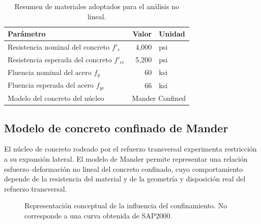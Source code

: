 \documentclass[11pt,a4paper]{article}
\begin{document}
\begin{table}[H]
\centering
\caption{Resumen de materiales adoptados para el análisis no lineal.}
\begin{tabular}{p{8.0cm}r l}
\toprule
\textbf{Parámetro} & \textbf{Valor} & \textbf{Unidad}\\
\midrule
Resistencia nominal del concreto $f'_c$ & 4,000 & psi\\
Resistencia esperada del concreto $f'_{ce}$ & 5,200 & psi\\
Fluencia nominal del acero $f_y$ & 60 & ksi\\
Fluencia esperada del acero $f_{ye}$ & 66 & ksi\\
Modelo del concreto del núcleo & \multicolumn{2}{l}{Mander Confined}\\
\bottomrule
\end{tabular}
\end{table}

\subsection{Modelo de concreto confinado de Mander}
El núcleo de concreto rodeado por el refuerzo transversal experimenta
restricción a su expansión lateral. El modelo de Mander permite representar
una relación esfuerzo--deformación no lineal del concreto confinado, cuyo
comportamiento depende de la resistencia del material y de la geometría y
disposición real del refuerzo transversal.

\begin{figure}[H]
\centering
{}
\caption{Representación conceptual de la influencia del confinamiento. No corresponde a una curva obtenida de SAP2000.}
\end{figure}
\end{document}
